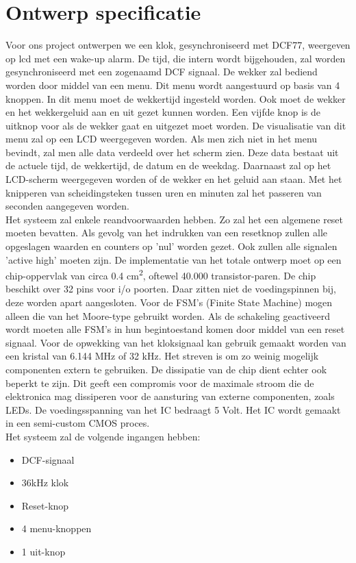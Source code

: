 \chapter{Ontwerp specificatie}
Voor ons project ontwerpen we een klok, gesynchroniseerd met DCF77, weergeven op lcd met een wake-up alarm. De tijd, die intern wordt bijgehouden, zal worden gesynchroniseerd met een zogenaamd DCF signaal. De wekker zal bediend worden door middel van een menu. Dit menu wordt aangestuurd op basis van 4 knoppen. In dit menu moet de wekkertijd ingesteld worden. Ook moet de wekker en het wekkergeluid aan en uit gezet kunnen worden. Een vijfde knop is de uitknop voor als de wekker gaat en uitgezet moet worden. De visualisatie van dit menu zal op een LCD weergegeven worden. Als men zich niet in het menu bevindt, zal men alle data verdeeld over het scherm zien. Deze data bestaat uit de actuele tijd, de wekkertijd, de datum en de weekdag. Daarnaast zal op het LCD-scherm weergegeven worden of de wekker en het geluid aan staan. Met het knipperen van scheidingsteken tussen uren en minuten zal het passeren van seconden aangegeven worden.\\

Het systeem zal enkele reandvoorwaarden hebben. Zo zal het een algemene reset moeten bevatten. Als gevolg van het indrukken van een resetknop zullen alle opgeslagen waarden en counters op 'nul' worden gezet. Ook zullen alle signalen 'active high' moeten zijn. De implementatie van het totale ontwerp moet op een chip-oppervlak van circa 0.4 cm\textsuperscript{2}, oftewel 40.000 transistor-paren. De chip beschikt over 32 pins voor i/o poorten. Daar zitten niet de voedingspinnen bij, deze worden apart aangesloten. Voor de FSM’s (Finite State Machine) mogen alleen die van het Moore-type gebruikt worden. Als de schakeling geactiveerd wordt moeten alle FSM’s in hun begintoestand komen door middel van een reset signaal. Voor de opwekking van het kloksignaal kan gebruik gemaakt worden van een kristal van 6.144 MHz of 32 kHz. Het streven is om zo weinig mogelijk componenten extern te gebruiken. De dissipatie van de chip dient echter ook beperkt te zijn. Dit geeft een compromis voor de maximale stroom die de elektronica mag dissiperen voor de aansturing van externe componenten, zoals LEDs. De voedingsspanning van het IC bedraagt 5 Volt. Het IC wordt gemaakt in een semi-custom CMOS proces. \\

Het systeem zal de volgende ingangen hebben:
\begin{itemize}[nolistsep]
\item	DCF-signaal
\item	36kHz klok
\item	Reset-knop
\item	4 menu-knoppen
\item  1 uit-knop
\end{itemize}

